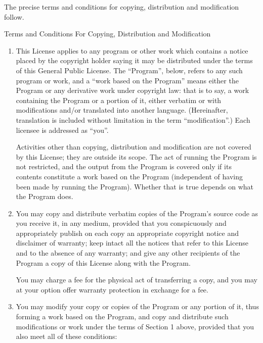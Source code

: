 \documentclass[a4paper,11pt,oneside]{book}
\begin{document}
The precise terms and conditions for copying, distribution and
modification follow.

\begin{center}
	{\Large \sc Terms and Conditions For Copying, Distribution and
		Modification}
\end{center}


\begin{enumerate}

	\addtocounter{enumi}{-1}

	\item

	This License applies to any program or other work which contains a notice
	placed by the copyright holder saying it may be distributed under the
	terms of this General Public License.  The ``Program'', below, refers to
	any such program or work, and a ``work based on the Program'' means either
	the Program or any derivative work under copyright law: that is to say, a
	work containing the Program or a portion of it, either verbatim or with
	modifications and/or translated into another language.  (Hereinafter,
	translation is included without limitation in the term ``modification''.)
	Each licensee is addressed as ``you''.

	Activities other than copying, distribution and modification are not
	covered by this License; they are outside its scope.  The act of
	running the Program is not restricted, and the output from the Program
	is covered only if its contents constitute a work based on the
	Program (independent of having been made by running the Program).
	Whether that is true depends on what the Program does.

	\item You may copy and distribute verbatim copies of the Program's source
	code as you receive it, in any medium, provided that you conspicuously
	and appropriately publish on each copy an appropriate copyright notice
	and disclaimer of warranty; keep intact all the notices that refer to
	this License and to the absence of any warranty; and give any other
	recipients of the Program a copy of this License along with the Program.

	You may charge a fee for the physical act of transferring a copy, and you
	may at your option offer warranty protection in exchange for a fee.

	\item

	You may modify your copy or copies of the Program or any portion
	of it, thus forming a work based on the Program, and copy and
	distribute such modifications or work under the terms of Section 1
	above, provided that you also meet all of these conditions:


\end{enumerate}
\end{document}
